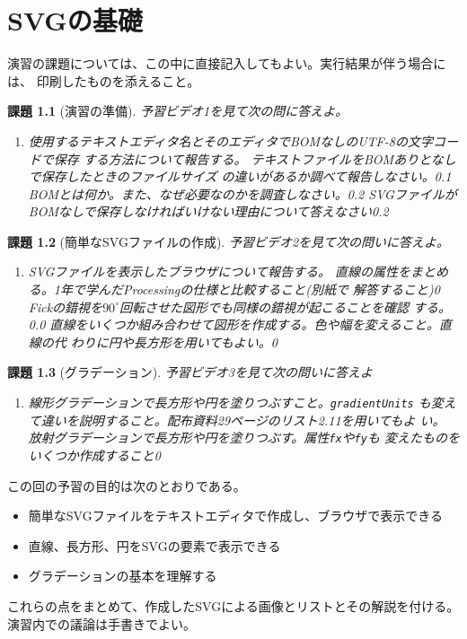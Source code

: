 \documentclass[a4j]{jreport}
\newtheorem{Report}{課題}
\newcommand{\Probs}[3]{%
 \begin{Report}[#1]\upshape
  #2
  \begin{enumerate}\upshape
  \ShowProbs#3\relax\relax
  \end{enumerate}
 \end{Report}
 }
\newcommand{\ShowProbs}[2]{\ifx#1\relax\else%
 \item #1\vspace{#2\textheight}\expandafter\ShowProbs\fi}
\newcommand{\changePage}[1]{
 \renewcommand{\thepage}{第\thechapter 回(#1)-\arabic{page}}
  \setcounter{page}{1}
}
\begin{document}
\chapter{SVGの基礎}
\changePage{4/18}
演習の課題については、この中に直接記入してもよい。実行結果が伴う場合には、
印刷したものを添えること。
\Probs{演習の準備}{予習ビデオ1を見て次の問に答えよ。}
 {
 {使用するテキストエディタ名とそのエディタでBOMなしのUTF-8の文字コードで保存
  する方法について報告する。}{0.1}
 {テキストファイルをBOMありとなしで保存したときのファイルサイズ
  の違いがあるか調べて報告しなさい。}{0.1}
  {BOMとは何か。また、なぜ必要なのかを調査しなさい。}{0.2}
%  
  {SVGファイルがBOMなしで保存しなければいけない理由について答えなさい}{0.2}
 }
\Probs{簡単なSVGファイルの作成}{予習ビデオ2を見て次の問いに答えよ。}
 {
 {SVGファイルを表示したブラウザについて報告する。}{0.05}
 {直線の属性をまとめる。1年で学んだProcessingの仕様と比較すること(別紙で
 解答すること)}{0}
 {Fickの錯視を$90^{\circ}$回転させた図形でも同様の錯視が起こることを確認
 する。}{0.0}
 {直線をいくつか組み合わせて図形を作成する。色や幅を変えること。直線の代
 わりに円や長方形を用いてもよい。}{0}
 }
 \Probs{グラデーション}{予習ビデオ3を見て次の問いに答えよ}
 {
 {線形グラデーションで長方形や円を塗りつぶすこと。\texttt{gradientUnits}
 も変えて違いを説明すること。配布資料29ページのリスト2.11を用いてもよ
 い。}{0}
 {放射グラデーションで長方形や円を塗りつぶす。属性\texttt{fx}や\texttt{fy}も
 変えたものをいくつか作成すること}{0}
 }
{この回の予習の目的は次のとおりである。
\begin{itemize}
 \item 簡単なSVGファイルをテキストエディタで作成し、ブラウザで表示できる
 \item 直線、長方形、円をSVGの要素で表示できる
 \item グラデーションの基本を理解する
\end{itemize}
これらの点をまとめて、作成したSVGによる画像とリストとその解説を付ける。
演習内での議論は手書きでよい。}
\end{document}
